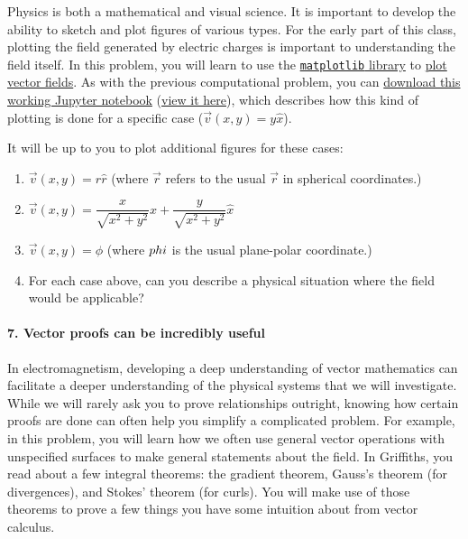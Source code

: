 \documentclass[11pt]{article}
\def\tightlist{}
\begin{document}
Physics is both a mathematical and visual science. It is important to
develop the ability to sketch and plot figures of various types. For the
early part of this class, plotting the field generated by electric
charges is important to understanding the field itself. In this problem,
you will learn to use the
\href{http://matplotlib.org}{\texttt{matplotlib} library} to
\href{http://matplotlib.org/examples/pylab_examples/quiver_demo.html}{plot
vector fields}. As with the previous computational problem, you can
\href{../jupyter/HW1-VectorFieldsProblem.ipynb}{download this working
Jupyter notebook}
(\href{https://github.com/dannycab/phy481msu/blob/gh-pages/jupyter/HW1-VectorFieldsProblem.ipynb}{view
it here}), which describes how this kind of plotting is done for a
specific case (\(\vec{v}(x,y)=y\hat{x}\)).

It will be up to you to plot additional figures for these cases:

\begin{enumerate}
\def\labelenumi{\arabic{enumi}.}
\tightlist
\item
  \(\vec{v}(x,y)=r\hat{r}\) (where \(\vec{r}\) refers to the usual
  \(\vec{r}\) in spherical coordinates.)
\item
  \(\vec{v}(x,y) = \dfrac{x}{\sqrt{x^2+y^2}}\hat{x}+\dfrac{y}{\sqrt{x^2+y^2}}\hat{x}\)
\item
  \(\vec{v}(x,y) = \hat{\phi}\) (where \(\\phi\) is the usual
  plane-polar coordinate.)
\item
  For each case above, can you describe a physical situation where the
  field would be applicable?
\end{enumerate}

\paragraph{7. Vector proofs can be incredibly
useful}\label{vector-proofs-can-be-incredibly-useful}

In electromagnetism, developing a deep understanding of vector
mathematics can facilitate a deeper understanding of the physical
systems that we will investigate. While we will rarely ask you to prove
relationships outright, knowing how certain proofs are done can often
help you simplify a complicated problem. For example, in this problem,
you will learn how we often use general vector operations with
unspecified surfaces to make general statements about the field. In
Griffiths, you read about a few integral theorems: the gradient theorem,
Gauss's theorem (for divergences), and Stokes' theorem (for curls). You
will make use of those theorems to prove a few things you have some
intuition about from vector calculus.
\end{document}

